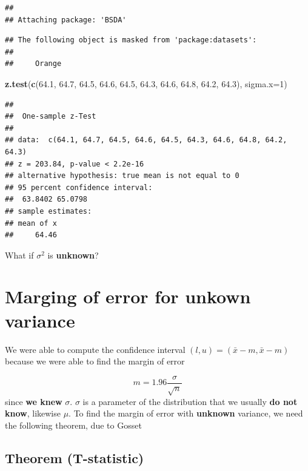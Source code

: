 \documentclass[
]{book}
\newenvironment{Shaded}{\begin{snugshade}}{\end{snugshade}}
\newcommand{\AttributeTok}[1]{\textcolor[rgb]{0.13,0.29,0.53}{#1}}
\newcommand{\DecValTok}[1]{\textcolor[rgb]{0.00,0.00,0.81}{#1}}
\newcommand{\FloatTok}[1]{\textcolor[rgb]{0.00,0.00,0.81}{#1}}
\newcommand{\FunctionTok}[1]{\textcolor[rgb]{0.13,0.29,0.53}{\textbf{#1}}}
\newcommand{\NormalTok}[1]{#1}
\begin{document}
\begin{verbatim}
## 
## Attaching package: 'BSDA'
\end{verbatim}

\begin{verbatim}
## The following object is masked from 'package:datasets':
## 
##     Orange
\end{verbatim}

\begin{Shaded}
\begin{Highlighting}[]
\FunctionTok{z.test}\NormalTok{(}\FunctionTok{c}\NormalTok{(}\FloatTok{64.1}\NormalTok{, }\FloatTok{64.7}\NormalTok{, }\FloatTok{64.5}\NormalTok{, }\FloatTok{64.6}\NormalTok{, }\FloatTok{64.5}\NormalTok{, }\FloatTok{64.3}\NormalTok{, }\FloatTok{64.6}\NormalTok{, }\FloatTok{64.8}\NormalTok{, }\FloatTok{64.2}\NormalTok{, }\FloatTok{64.3}\NormalTok{), }
       \AttributeTok{sigma.x=}\DecValTok{1}\NormalTok{)}
\end{Highlighting}
\end{Shaded}

\begin{verbatim}
## 
##  One-sample z-Test
## 
## data:  c(64.1, 64.7, 64.5, 64.6, 64.5, 64.3, 64.6, 64.8, 64.2, 64.3)
## z = 203.84, p-value < 2.2e-16
## alternative hypothesis: true mean is not equal to 0
## 95 percent confidence interval:
##  63.8402 65.0798
## sample estimates:
## mean of x 
##     64.46
\end{verbatim}

What if \(\sigma^2\) is \textbf{unknown}?

\hypertarget{marging-of-error-for-unkown-variance}{%
\section{Marging of error for unkown variance}\label{marging-of-error-for-unkown-variance}}

We were able to compute the confidence interval \((l,u)=(\bar{x} -m, \bar{x} -m)\) because we were able to find the margin of error

\[m=1.96 \frac{\sigma}{\sqrt{n}}\]
since \textbf{we knew} \(\sigma\). \(\sigma\) is a parameter of the distribution that we usually \textbf{do not know}, likewise \(\mu\). To find the margin of error with \textbf{unknown} variance, we need the following theorem, due to Gosset

\hypertarget{theorem-t-statistic}{%
\subsection{Theorem (T-statistic)}\label{theorem-t-statistic}}
\end{document}
